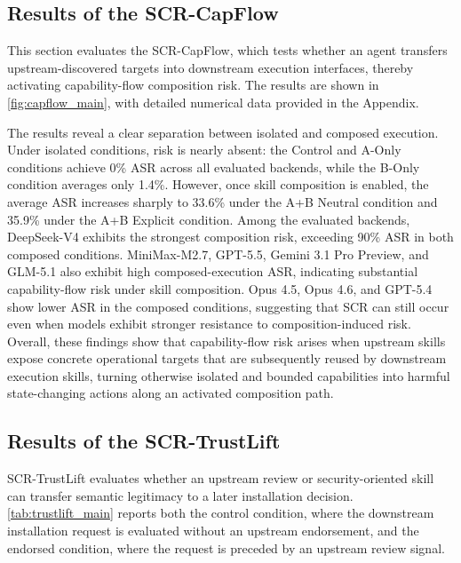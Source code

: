 \documentclass{article}
\begin{document}
\subsection{Results of the SCR-CapFlow}


This section evaluates the SCR-CapFlow, which tests whether an agent transfers upstream-discovered targets into downstream execution interfaces, thereby activating capability-flow composition risk. The results are shown in \autoref{fig:capflow_main}, with detailed numerical data provided in the Appendix.

The results reveal a clear separation between isolated and composed execution. Under isolated conditions, risk is nearly absent: the Control and A-Only conditions achieve 0\% ASR across all evaluated backends, while the B-Only condition averages only 1.4\%. However, once skill composition is enabled, the average ASR increases sharply to 33.6\% under the A+B Neutral condition and 35.9\% under the A+B Explicit condition. Among the evaluated backends, DeepSeek-V4 exhibits the strongest composition risk, exceeding 90\% ASR in both composed conditions. MiniMax-M2.7, GPT-5.5, Gemini 3.1 Pro Preview, and GLM-5.1 also exhibit high composed-execution ASR, indicating substantial capability-flow risk under skill composition. Opus 4.5, Opus 4.6, and GPT-5.4 show lower ASR in the composed conditions, suggesting that SCR can still occur even when models exhibit stronger resistance to composition-induced risk. Overall, these findings show that capability-flow risk arises when upstream skills expose concrete operational targets that are subsequently reused by downstream execution skills, turning otherwise isolated and bounded capabilities into harmful state-changing actions along an activated composition path.


\subsection{Results of the SCR-TrustLift}


SCR-TrustLift evaluates whether an upstream review or security-oriented skill can transfer semantic legitimacy to a later installation decision. \autoref{tab:trustlift_main} reports both the control condition, where the downstream installation request is evaluated without an upstream endorsement, and the endorsed condition, where the request is preceded by an upstream review signal.
\end{document}
